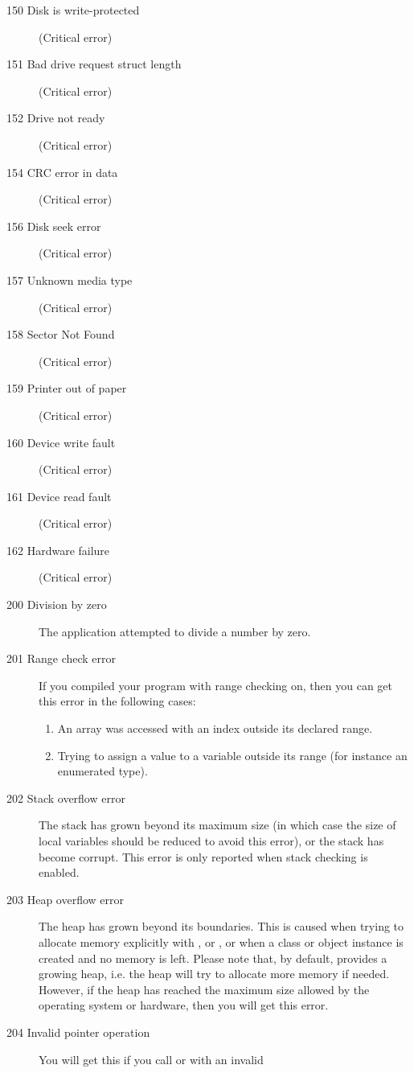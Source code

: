\begin{description}
\item [150  Disk is write-protected]
(Critical error)
\item [151  Bad drive request struct length]
(Critical error)
\item [152  Drive not ready]
(Critical error)
\item [154  CRC error in data]
(Critical error)
\item [156  Disk seek error]
(Critical error)
\item [157  Unknown media type]
(Critical error)
\item [158  Sector Not Found]
(Critical error)
\item [159  Printer out of paper]
(Critical error)
\item [160  Device write fault]
(Critical error)
\item [161  Device read fault]
(Critical error)
\item [162  Hardware failure]
(Critical error)
\item [200  Division by zero]
The application attempted to divide a number by zero.
\item [201  Range check error]
If you compiled your program with range checking on, then you can get this
error in the following cases:
\begin{enumerate}
\item An array was accessed with an index outside its declared range.
\item Trying to assign a value to a variable outside its range (for
instance an enumerated type).
\end{enumerate}
\item [202  Stack overflow error]
The stack has grown beyond its maximum size (in which case the size of 
local variables should be reduced to avoid this error), or the stack has 
become corrupt. This error is only reported when stack checking is enabled.
\item [203  Heap overflow error]
The heap has grown beyond its boundaries. This is caused when trying to allocate
memory explicitly with ,  or , or when
a class or object instance is created and no memory is left. Please note 
that, by default, \fpc provides a growing heap, i.e. the heap will
try to allocate more memory if needed. However, if the heap has reached the
maximum size allowed by the operating system or hardware, then you will get
this error.
\item [204  Invalid pointer operation]
You will get this if you call  or  with an invalid 

\end{description}
